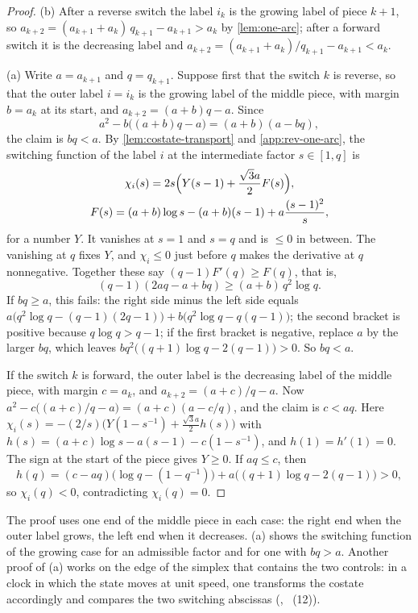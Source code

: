 \begin{proof}
(b) After a reverse switch the label $i_k$ is the growing label of piece $k+1$, so
$a_{k+2}=(a_{k+1}+a_k)\,q_{k+1}-a_{k+1}>a_k$ by \cref{lem:one-arc}; after a forward switch it is
the decreasing label and $a_{k+2}=(a_{k+1}+a_k)/q_{k+1}-a_{k+1}<a_k$.

(a) Write $a=a_{k+1}$ and $q=q_{k+1}$. Suppose first that the switch $k$ is reverse, so that the
outer label $i=i_k$ is the growing label of the middle piece, with margin $b=a_k$ at its start, and
$a_{k+2}=(a+b)q-a$. Since
\[
  a^2-b\bigl((a+b)q-a\bigr)=(a+b)(a-bq),
\]
the claim is $bq<a$. By \cref{lem:costate-transport} and \cref{app:rev-one-arc}, the switching
function of the label $i$ at the intermediate factor $s\in[1,q]$ is
\begin{gather*}
  \chi_i(s)=2s\Bigl(Y(s-1)+\frac{\sqrt3a}{2}F(s)\Bigr),\\
  F(s)=(a+b)\log s-(a+b)(s-1)+a\frac{(s-1)^2}{s},
\end{gather*}
for a number $Y$. It vanishes at $s=1$ and $s=q$ and is $\le0$ in between. The vanishing at $q$
fixes $Y$, and $\chi_i\le0$ just before $q$ makes the derivative at $q$ nonnegative. Together
these say $(q-1)F'(q)\ge F(q)$, that is,
\[
  (q-1)(2aq-a+bq)\ge(a+b)\,q^2\log q.
\]
If $bq\ge a$, this fails: the right side minus the left side equals
$a\bigl(q^2\log q-(q-1)(2q-1)\bigr)+b\bigl(q^2\log q-q(q-1)\bigr)$; the second bracket is
positive because $q\log q>q-1$; if the first bracket is negative, replace $a$ by the larger
$bq$, which leaves $bq^2\bigl((q+1)\log q-2(q-1)\bigr)>0$. So $bq<a$.

If the switch $k$ is forward, the outer label is the decreasing label of the middle piece, with
margin $c=a_k$, and $a_{k+2}=(a+c)/q-a$. Now $a^2-c\bigl((a+c)/q-a\bigr)=(a+c)(a-c/q)$, and the
claim is $c<aq$. Here $\chi_i(s)=-(2/s)\bigl(Y(1-s^{-1})+\frac{\sqrt3a}{2}h(s)\bigr)$ with
$h(s)=(a+c)\log s-a(s-1)-c(1-s^{-1})$, and $h(1)=h'(1)=0$. The sign at the start of the piece
gives $Y\ge0$. If $aq\le c$, then
\[
  h(q)=(c-aq)\bigl(\log q-(1-q^{-1})\bigr)+a\bigl((q+1)\log q-2(q-1)\bigr)>0,
\]
so $\chi_i(q)<0$, contradicting $\chi_i(q)=0$.
\end{proof}

The proof uses one end of the middle piece in each case: the right end when the outer label grows,
the left end when it decreases. (a) shows the switching function of
the growing case for an admissible factor and for one with $bq>a$. Another proof of (a) works on
the edge of the simplex that contains the two controls: in a clock in which the state moves at
unit speed, one transforms the costate accordingly and compares the two switching abscissas
(\cite{Notes}, ~(12)).

